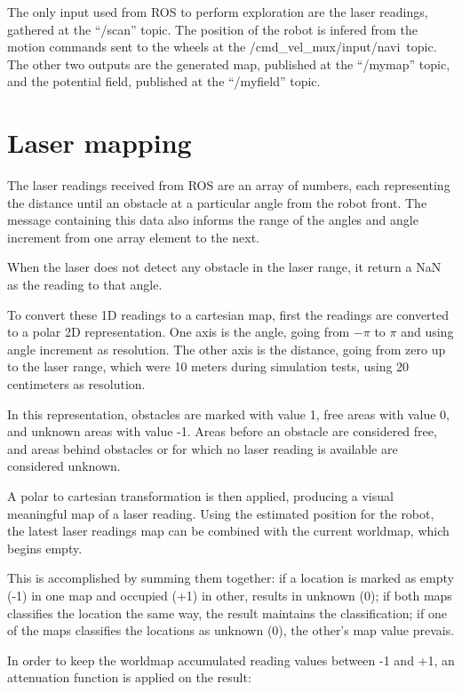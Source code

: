\documentclass[a4paper,twocolumn]{article}
\begin{document}
    The only input used from ROS to perform exploration are the laser readings, gathered at the ``/scan'' topic. The position of the robot is infered from the motion commands sent to the wheels at the /cmd\_vel\_mux/input/navi\ topic. The other two outputs are the generated map, published at the ``/mymap'' topic, and the potential field, published at the ``/myfield'' topic.

\section{Laser mapping}
    The laser readings received from ROS are an array of numbers, each representing the distance until an obstacle at a particular angle from the robot front. The message containing this data also informs the range of the angles and angle increment from one array element to the next.

    When the laser does not detect any obstacle in the laser range, it return a NaN as the reading to that angle.

    To convert these 1D readings to a cartesian map, first the readings are converted to a polar 2D representation. One axis is the angle, going from $-\pi$ to $\pi$ and using angle increment as resolution. The other axis is the distance, going from zero up to the laser range, which were 10 meters during simulation tests, using 20 centimeters as resolution.
    
    In this representation, obstacles are marked with value 1, free areas with value 0, and unknown areas with value -1. Areas before an obstacle are considered free, and areas behind obstacles or for which no laser reading is available are considered unknown.

    A polar to cartesian transformation is then applied, producing a visual meaningful map of a laser reading. Using the estimated position for the robot, the latest laser readings map can be combined with the current worldmap, which begins empty.
    
    This is accomplished by summing them together: if a location is marked as empty (-1) in one map and occupied (+1) in other, results in unknown (0); if both maps classifies the location the same way, the result maintains the classification; if one of the maps classifies the locations as unknown (0), the other's map value prevais.

    In order to keep the worldmap accumulated reading values between -1 and +1, an attenuation function is applied on the result:
\end{document}
